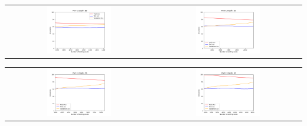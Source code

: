 \begin{enumerate}[label=(\alph*)]
          \begin{center}
              \begin{center}
                  \begin{tabular}{c c}
                      \includegraphics[width=0.45\textwidth]{./images/q1_part_c_depth15.png} & \includegraphics[width=0.45\textwidth]{./images/q1_part_c_depth25.png}
                  \end{tabular}
                  \begin{tabular}{c c}
                      \includegraphics[width=0.45\textwidth]{./images/q1_part_c_depth35.png} & \includegraphics[width=0.45\textwidth]{./images/q1_part_c_depth45.png}
                  \end{tabular}
              \end{center}
          \end{center}


\end{enumerate}

